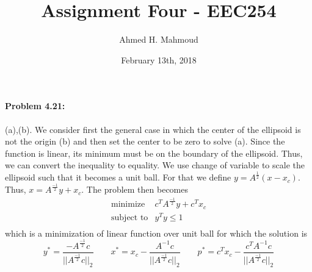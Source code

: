\documentclass[12pt] {article}
\begin{document}
\title{Assignment Four -  EEC254}
\author{Ahmed H. Mahmoud}
\date{February 13th, 2018}
\maketitle




\paragraph{Problem 4.21:} 
(a),(b). We consider first the general case in which the center of the ellipsoid is not the origin (b) and then set the center to be zero to solve (a). Since the function is linear, its minimum must be on the boundary of the ellipsoid. Thus, we can convert the inequality to equality. We use change of variable to scale the ellipsoid such that it becomes a unit ball. For that we define $y = A^{\frac{1}{2}}(x-x_{c})$. Thus, $x = A^{\frac{-1}{2}}y +x_{c}$. The problem then becomes 
\[
\begin{array}{cl}
\text{minimize} & c^{T}A^{\frac{-1}{2}}y +c^{T}x_{c}\\
\text{subject to} & y^{T}y \leq 1\\
\end{array} 
\]
which is a minimization of linear function over unit ball for which the solution is 
$$
y^{*} = \frac{-A^{\frac{-1}{2}}c}{||A^{\frac{-1}{2}}c||_{2}} \quad \quad x^{*} = x_{c} - \frac{A^{-1}c}{||A^{\frac{-1}{2}}c ||_{2}} \quad \quad p^{*}= c^{T}x_{c} - \frac{c^{T}A^{-1}c}{||A^{\frac{-1}{2}}c ||_{2}}
$$
\end{document}
